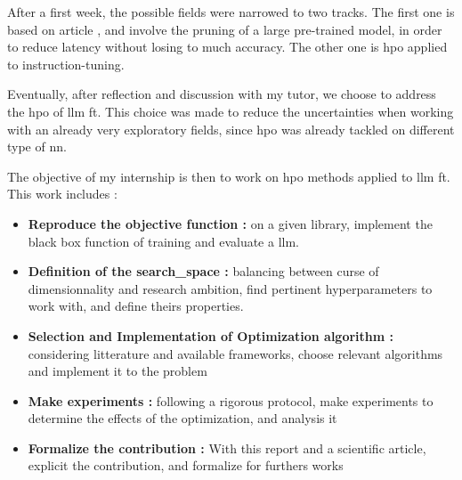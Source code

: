 After a first week, the possible fields were narrowed to two tracks. The first one is based on article \cite{klein_structural_2023}, and involve the pruning of a large pre-trained model, in order to reduce latency without losing to much accuracy. The other one \cite{tribes_hyperparameter_2024} is \acrlong{hpo} applied to \gls{instruction-tuning}.  

Eventually, after reflection and discussion with my tutor, we choose to address the \acrshort{hpo} of \acrshort{llm} \gls{ft}. This choice was made to reduce the uncertainties when working with an already very exploratory fields, since \acrshort{hpo} was already tackled on different type of \acrshort{nn}. 

The objective of my internship is then to work on \acrshort{hpo} methods applied to \acrshort{llm} \gls{ft}. This work includes : 
\begin{itemize}
    \item \textbf{Reproduce the objective function :} on a given library, implement the black box function of training and evaluate a \acrshort{llm}.
    \item \textbf{Definition of the \gls{search_space} : }balancing between curse of dimensionnality and research ambition, find pertinent \glspl{hyperparameter} to work with, and define theirs properties.
    \item \textbf{Selection and Implementation of Optimization algorithm :} considering litterature and available frameworks, choose relevant algorithms and implement it to the problem
    \item \textbf{Make experiments :} following a rigorous protocol, make experiments to determine the effects of the optimization, and analysis it
    \item \textbf{Formalize the contribution :} With this report and a scientific article, explicit the contribution, and formalize for furthers works
\end{itemize}

